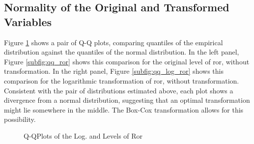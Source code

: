 \documentclass[11pt]{paper}
\begin{document}
\pagebreak
\subsection{Normality of the Original and Transformed Variables}

Figure \ref{fig:qq_ror} shows a pair of Q-Q plots, 
comparing quantiles of the empirical distribution against
the quantiles of the normal distribution. 
In the left panel, Figure \ref{subfig:qq_ror} shows this comparison 
for the original level of  ror, without transformation. 
In the right panel, Figure \ref{subfig:qq_log_ror} shows this comparison 
for the logarithmic transformation of  ror, without transformation. 
Consistent with the pair of distributions estimated above, 
each plot shows a divergence from a normal distribution,
suggesting that an optimal transformation might lie somewhere in the middle.
The Box-Cox transformation allows for this possibility. 

\begin{figure}[!ht]
\hfill
{}

\caption{Q-QPlots of the Log. and Levels of Ror}
\label{fig:qq_ror}
\end{figure}
\end{document}
